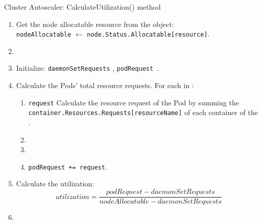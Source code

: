 \begin{algorithm}[H]
\caption{Cluster Autoscaler: CalculateUtilization() method}\label{alg:utilization}
    \begin{enumerate}[leftmargin=0.5cm]
        \tightlist
        \item  Get the node allocatable resource from the  object:\\ \texttt{nodeAllocatable} \(\leftarrow\) \texttt{node.Status.Allocatable[resource]}.
        \item {}
        \item Initialize: \texttt{daemonSetRequests} , \texttt{podRequest }.
        \item Calculate the Pods' total resource requests. For each  in : 
            \begin{enumerate}
            \tightlist
            \item \texttt{request} \lar  Calculate the resource request of the Pod by summing the
                \texttt{container.Resources.Requests{[}resourceName{]}} of each container of the
                .
            \item {}
            \item {}
            \item \texttt{podRequest += request}.
            \end{enumerate}
    \item Calculate the utilization: \[ utilization =  \frac{podRequest - daemonSetRequests}{ nodeAllocatable - daemonSetRequests} \]
    \item {} 

    \end{enumerate}
\end{algorithm}

